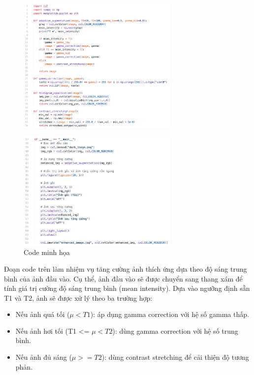 \begin{itemize}[]
      \begin{figure}[H]
    \centering
    \includegraphics[width=0.7\textwidth]{img/thuatToan_01.jpg} %
    \label{fig:emotion_distribution}
\end{figure}
  \begin{figure}[H]
    \centering
    \includegraphics[width=0.7\textwidth]{img/thuatToan_02.jpg} %
    \caption{Code minh họa}
    \label{fig:emotion_distribution}
\end{figure}



   
\end{itemize}

    
Đoạn code trên làm nhiệm vụ tăng cường ảnh thích ứng dựa theo độ sáng trung bình của ảnh đầu vào. Cụ thể, ảnh đầu vào sẽ được chuyển sang thang xám để tính giá trị cường độ sáng trung bình (mean intensity). Dựa vào ngưỡng định sẵn T1 và T2, ảnh sẽ được xử lý theo ba trường hợp:
\begin{itemize}[]
     \item Nếu ảnh quá tối ($\mu < T1$): áp dụng gamma correction với hệ số gamma thấp.
     \item Nếu ảnh hơi tối (T1 <= $\mu < T2$): dùng gamma correction với hệ số trung bình.
     \item Nếu ảnh đủ sáng ($\mu >= T2$): dùng contrast stretching để cải thiện độ tương phản.
\end{itemize}
    
